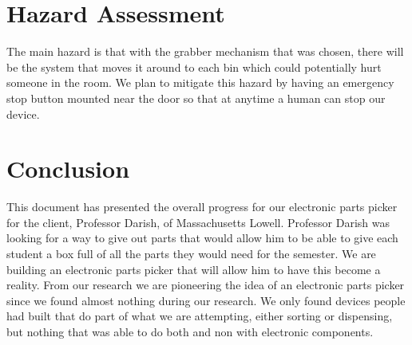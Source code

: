 \documentclass[12pt]{report}
\begin{document}


\section*{Hazard Assessment}

The main hazard is that with the grabber mechanism that was chosen, there will be the system that moves it around to each bin which could potentially hurt someone in the room. We plan to mitigate this hazard by having an emergency stop button mounted near the door so that at anytime a human can stop our device.  

\section*{Conclusion}

This document has presented the overall progress for our electronic parts picker for the client, Professor Darish, of Massachusetts Lowell. Professor Darish was looking for a way to give out parts that would allow him to be able to give each student a box full of all the parts they would need for the semester. We are building an electronic parts picker that will allow him to have this become a reality. From our research we are pioneering the idea of an electronic parts picker since we found almost nothing during our research. We only found devices people had built that do part of what we are attempting, either sorting or dispensing, but nothing that was able to do both and non with electronic components. 



\end{document}
